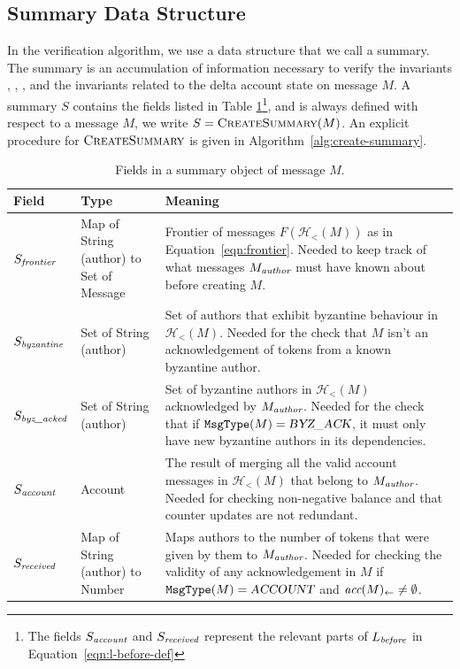\subsection{Summary Data Structure}
In the verification algorithm, we use a data structure that we call a summary.
The summary is an accumulation of information necessary to verify the invariants , , ,  and the invariants related to the delta account state on message $M$. A summary $S$ contains the fields listed in Table \ref{tab:summary-fields}\footnote{The fields $S_\emph{account}$ and $S_\emph{received}$ represent the relevant parts of $L_\emph{before}$ in Equation~\ref{eqn:l-before-def}}, and is always defined with respect to a message $M$, we write $S = \textsc{CreateSummary}(M)$.
An explicit procedure for $\textsc{CreateSummary}$ is given in Algorithm~\ref{alg:create-summary}.
\begin{table}[ht]
    \centering
    \begin{tabular}{|l|p{3cm}|p{7cm}|}
        \hline
        \textbf{Field} & \textbf{Type} & \textbf{Meaning} \\ \hline
        $S_\emph{frontier}$ &
        Map of String (author) to Set of Message&
        Frontier of messages $F(\mathcal H_<(M))$ as in Equation~\ref{eqn:frontier}. Needed to keep track of what messages $M_\emph{author}$ must have known about before creating $M$.
        \\ \hline
        $S_\emph{byzantine}$ &
        Set of String (author)&
        Set of authors that exhibit byzantine behaviour in $\mathcal H_<(M)$. Needed for the check that $M$ isn't an acknowledgement of tokens from a known byzantine author.
        \\ \hline
        $S_\emph{byz\_acked}$ &
        Set of String (author)&
        Set of byzantine authors in $\mathcal H_<(M)$ acknowledged by $M_\emph{author}$. Needed for the check that if $\texttt{MsgType}(M) = \textsl{BYZ\_ACK}$, it must only have new byzantine authors in its dependencies.
        \\ \hline
        $S_\emph{account}$ &
        Account &
        The result of merging all the valid account messages in $\mathcal H_<(M)$ that belong to $M_\emph{author}$. Needed for checking non-negative balance and that counter updates are not redundant.
        \\ \hline
        $S_\emph{received}$ &
        Map of String (author) to Number &
        Maps authors to the number of tokens that were given by them to $M_\emph{author}$. Needed for checking the validity of any acknowledgement in $M$ if $\texttt{MsgType}(M) = \textsl{ACCOUNT}$ and $\textit{acc}(M)_\leftarrow \neq \emptyset$.
        \\ \hline
    \end{tabular}
    \caption{Fields in a summary object of message $M$.}
    \label{tab:summary-fields}
\end{table}

